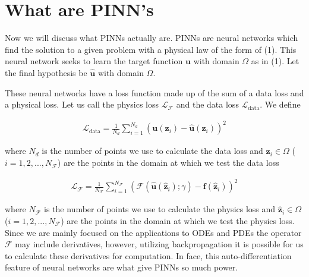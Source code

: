 \documentclass{article}
\begin{document}
\section{What are PINN's}

Now we will discuss what PINNs actually are. PINNs are neural networks which find the solution to a given problem with a physical law of the form of (1). This neural network seeks to learn the target function $\textbf{u}$ with domain $\Omega$ as in (1). Let the final hypothesis be $\hat{\textbf{u}}$ with domain $\Omega$.

These neural networks have a loss function made up of the sum of a data loss and a physical loss. Let us call the physics loss $\mathcal{L}_{\mathcal{F}}$ and the data loss $\mathcal{L}_{\text{data}}$. We define

\begin{align}
    \mathcal{L}_{\text{data}} = \frac{1}{N_d} \sum_{i = 1}^{N_d} \left( \textbf{u}(\textbf{z}_i) - \hat{\textbf{u}}(\textbf{z}_i) \right)^2
\end{align}

where $N_{d}$ is the number of points we use to calculate the data loss and  $\textbf{z}_i \in \Omega$ ($i = 1,2,...,N_{\mathcal F}$) are the points in the domain at which we test the data loss

\begin{align}
    \mathcal{L}_{\mathcal{F}} = \frac{1}{N_{\mathcal F}} \sum_{i = 1}^{N_{\mathcal F}} \left( \mathcal{F}(\hat{\textbf{u}}(\hat{\textbf{z}}_i); \gamma) - \textbf{f}(\hat{\textbf{z}}_i) \right)^2
\end{align}

where $N_{\mathcal F}$ is the number of points we use to calculate the physics loss and  $\hat{\textbf{z}}_i \in \Omega$ ($i = 1,2,...,N_{\mathcal F}$) are the points in the domain at which we test the physics loss. Since we are mainly focused on the applications to ODEs and PDEs the operator $\mathcal F$ may include derivatives, however, utilizing backpropagation it is possible for us to calculate these derivatives for computation. In face, this auto-differentiation feature of neural networks are what give PINNs so much power.
\end{document}
